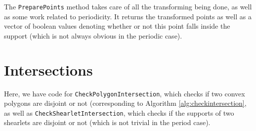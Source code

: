 The {\tt PreparePoints} method takes care of all the transforming being done, as well as some work related to
periodicity. It returns the transformed points as well as a vector of boolean values denoting whether or not
this point falls inside the support (which is not always obvious in the periodic case).



%
%
%
%
%
%



%
%
%
%
%
%

\section{Intersections}

Here, we have code for {\tt CheckPolygonIntersection}, which checks if two convex polygons are disjoint or
not (corresponding to Algorithm \ref{alg:checkintersection}, as well as {\tt CheckShearletIntersection}, which
checks if the supports of two shearlets are disjoint or not (which is not trivial in the period case).

